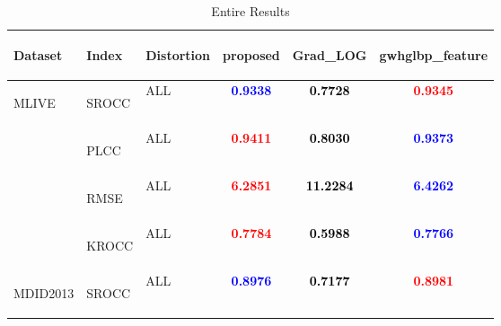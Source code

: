 \documentclass{article}
\begin{document}
\begin{table}
\scriptsize
\caption{Entire Results}
\label{tbl:whole}
\begin{tabular}{||l|l|l||ccc||}
\toprule
\toprule
\begin{turn}{-90}\textbf{Dataset}\end{turn}&\begin{turn}{-90}\textbf{Index}\end{turn}&\begin{turn}{-90}\textbf{Distortion}\end{turn}&\begin{turn}{-90}\textbf{proposed}\end{turn}&\begin{turn}{-90}\textbf{Grad\_LOG}\end{turn}&\begin{turn}{-90}\textbf{gwhglbp\_feature}\end{turn}\\
\midrule
\midrule
\multirow{4}{*}{\begin{turn}{-90}MLIVE\end{turn}}&\multirow{1}{*}{\begin{turn}{-90}SROCC\end{turn}}&ALL&\textbf{\textcolor{blue}{0.9338}}&\textbf{\textcolor{black}{0.7728}}&\textbf{\textcolor{red}{0.9345}}\\
\cmidrule{2-6}\cmidrule{2-6}
&\multirow{1}{*}{\begin{turn}{-90}PLCC\end{turn}}&ALL&\textbf{\textcolor{red}{0.9411}}&\textbf{\textcolor{black}{0.8030}}&\textbf{\textcolor{blue}{0.9373}}\\
\cmidrule{2-6}\cmidrule{2-6}
&\multirow{1}{*}{\begin{turn}{-90}RMSE\end{turn}}&ALL&\textbf{\textcolor{red}{6.2851}}&\textbf{\textcolor{black}{11.2284}}&\textbf{\textcolor{blue}{6.4262}}\\
\cmidrule{2-6}\cmidrule{2-6}
&\multirow{1}{*}{\begin{turn}{-90}KROCC\end{turn}}&ALL&\textbf{\textcolor{red}{0.7784}}&\textbf{\textcolor{black}{0.5988}}&\textbf{\textcolor{blue}{0.7766}}\\
\midrule\midrule
\multirow{4}{*}{\begin{turn}{-90}MDID2013\end{turn}}&\multirow{1}{*}{\begin{turn}{-90}SROCC\end{turn}}&ALL&\textbf{\textcolor{blue}{0.8976}}&\textbf{\textcolor{black}{0.7177}}&\textbf{\textcolor{red}{0.8981}}\\

\end{tabular}
\end{table}
\end{document}
